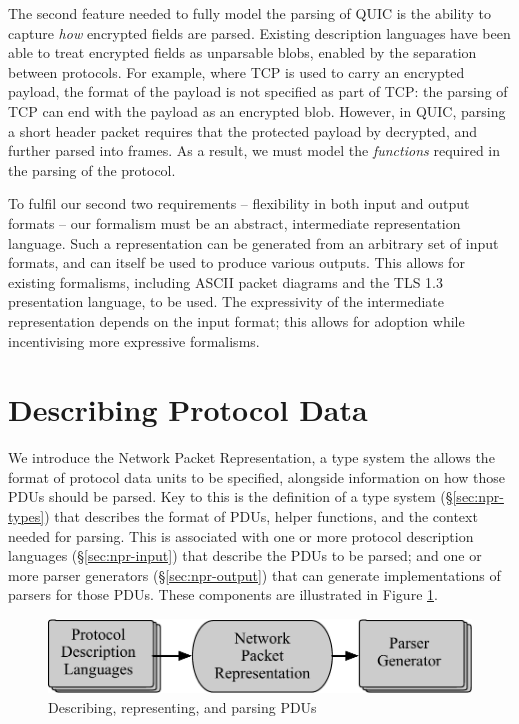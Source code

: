 \documentclass[10pt,sigconf]{acmart}
\begin{document}
The second feature needed to fully model the parsing of QUIC is the ability to capture
\emph{how} encrypted fields are parsed. Existing description
languages have been able to treat encrypted fields as unparsable blobs, enabled by the
separation between protocols. For example, where TCP is used to carry an encrypted
payload, the format of the payload is not specified as part of TCP: the parsing of TCP can
end with the payload as an encrypted blob. However, in QUIC, parsing a short header packet
requires that the protected payload by decrypted, and further parsed into frames. As a
result, we must model the \emph{functions} required in the parsing of the protocol.

To fulfil our second two requirements -- flexibility in both input and output formats --
our formalism must be an abstract, intermediate representation language. Such a
representation can be generated from an arbitrary set of input formats, and can itself be
used to produce various outputs. This allows for existing formalisms, including ASCII
packet diagrams and the TLS 1.3 presentation language, to be used. The expressivity
of the intermediate representation depends on the input format; this allows for adoption
while incentivising more expressive formalisms.

\section{Describing Protocol Data}
\label{sec:npr}

We introduce the Network Packet Representation, a type system the allows
the format of protocol data units to be specified, alongside information
on how those PDUs should be parsed.
Key to this is the definition of a type system (\S\ref{sec:npr-types}) that
describes the format of PDUs, helper functions, and the context needed for
parsing.
This is associated with one or more protocol description languages
(\S\ref{sec:npr-input}) that describe the PDUs to be parsed; and one
or more parser generators (\S\ref{sec:npr-output}) that can generate
implementations of parsers for those PDUs.
These components are illustrated in Figure \ref{fig:stages}.

\begin{figure}
  \includegraphics[width=\linewidth]{figures/architecture-flow.pdf}
  \caption{Describing, representing, and parsing PDUs}
  \label{fig:stages}
\end{figure}
\end{document}
